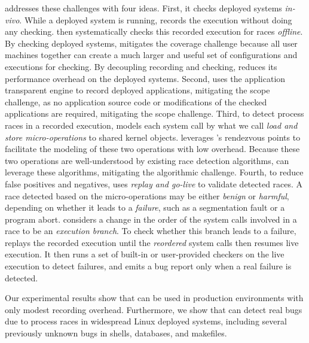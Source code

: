\racepro addresses these challenges with four ideas.  First, it checks deployed
systems \emph{in-vivo}.  While a deployed system is running, \racepro records
the execution without doing any checking.  \racepro then systematically checks
this recorded execution for races \emph{offline}.  By checking deployed systems,
\racepro mitigates the coverage challenge because all user machines together can
create a much larger and useful set of configurations and executions for
checking.  By decoupling recording and checking, \racepro reduces its
performance overhead on the deployed systems.
Second, \racepro uses the application transparent \scribe engine to record
deployed applications, mitigating the scope challenge, as no application source
code or modifications of the checked applications are required, mitigating the
scope challenge. Third, to detect process races in a recorded execution,
\racepro models each system call by what we call \emph{load and store
micro-operations} to shared kernel objects.  \racepro leverages \scribe's
rendezvous points to facilitate the modeling of these two operations with low
overhead.  Because these two operations are well-understood by existing race
detection algorithms, \racepro can leverage these algorithms, mitigating the
algorithmic challenge.  Fourth, to reduce false positives and negatives,
\racepro uses \emph{replay and go-live} to validate detected races.  A race
detected based on the micro-operations may be either \emph{benign} or
\emph{harmful}, depending on whether it leads to a \emph{failure}, such as a
segmentation fault or a program abort.  \racepro considers a change in the order
of the system calls involved in a race to be an \emph{execution branch}.  To
check whether this branch leads to a failure, \racepro replays the recorded
execution until the \emph{reordered} system calls then resumes live execution.
It then runs a set of built-in or user-provided checkers on the live execution
to detect failures, and emits a bug report only when a real failure is detected.

Our experimental results show that \racepro can be used in production
environments with only modest recording overhead.  Furthermore, we show that
\racepro can detect real bugs due to process races in widespread Linux
deployed systems, including several previously unknown bugs in shells,
databases, and makefiles.

